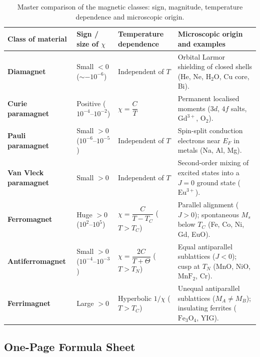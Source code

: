 \documentclass[11pt,a4paper]{article}
\begin{document}
\begin{table}[htbp]
\centering
\small
\renewcommand{\arraystretch}{1.3}
\begin{tabularx}{\textwidth}{L{2.9cm} L{3.2cm} L{3.5cm} Y}
\toprule
\textbf{Class of material} & \textbf{Sign / size of $\chi$} & \textbf{Temperature dependence} & \textbf{Microscopic origin and examples} \\
\midrule
\textbf{Diamagnet} & Small $<0$ ($\sim-10^{-6}$) & Independent of $T$ & Orbital Larmor shielding of closed shells (He, Ne, $\text{H}_2\text{O}$, Cu core, Bi). \\
\addlinespace
\textbf{Curie paramagnet} & Positive ($10^{-4}$--$10^{-2}$) & $\chi = \dfrac{C}{T}$ & Permanent localised moments ($3d$, $4f$ salts, $\text{Gd}^{3+}$, $\text{O}_2$). \\
\addlinespace
\textbf{Pauli paramagnet} & Small $>0$ ($10^{-6}$--$10^{-5}$) & Independent of $T$ & Spin-split conduction electrons near $E_F$ in metals (Na, Al, Mg). \\
\addlinespace
\textbf{Van Vleck paramagnet} & Small $>0$ & Independent of $T$ & Second-order mixing of excited states into a $J=0$ ground state ($\text{Eu}^{3+}$). \\
\addlinespace
\textbf{Ferromagnet} & Huge $>0$ ($10^{2}$--$10^{5}$) & $\chi = \dfrac{C}{T-T_C}$ ($T>T_C$) & Parallel alignment ($J>0$); spontaneous $M_s$ below $T_C$ (Fe, Co, Ni, Gd, EuO). \\
\addlinespace
\textbf{Antiferromagnet} & Small $>0$ ($10^{-4}$--$10^{-3}$) & $\chi = \dfrac{2C}{T+\Theta}$ ($T>T_N$) & Equal antiparallel sublattices ($J<0$); cusp at $T_N$ ($\text{MnO}$, $\text{NiO}$, $\text{MnF}_2$, Cr). \\
\addlinespace
\textbf{Ferrimagnet} & Large $>0$ & Hyperbolic $1/\chi$ ($T>T_C$) & Unequal antiparallel sublattices ($M_A\neq M_B$); insulating ferrites ($\text{Fe}_3\text{O}_4$, YIG). \\
\bottomrule
\end{tabularx}
\caption{Master comparison of the magnetic classes: sign, magnitude, temperature dependence and microscopic origin.}
\label{tab:master}
\end{table}

\clearpage
\subsection{One-Page Formula Sheet}
\end{document}
